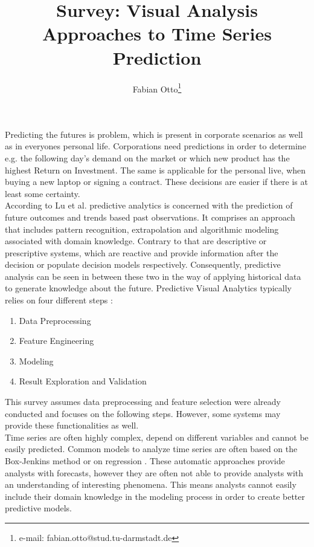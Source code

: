 \documentclass[electronic]{vgtc}             %
\title{Survey: Visual Analysis Approaches to Time Series Prediction}
\author{Fabian Otto\thanks{e-mail: fabian.otto@stud.tu-darmstadt.de}}
\affiliation{\scriptsize Technische Universit\"at Darmstadt}
\begin{document}

\maketitle

Predicting the futures is problem, which is present in corporate scenarios as well as in everyones personal life. 
Corporations need predictions in order to determine e.g. the following day's demand on the market or which new product has the highest Return on Investment.
The same is applicable for the personal live, when buying a new laptop or signing a contract.
These decisions are easier if there is at least some certainty.\\
According to Lu et al. \cite{Lu:2017} predictive analytics is concerned with the prediction of future outcomes and trends based past observations. 
It comprises an approach that includes pattern recognition, extrapolation and algorithmic modeling associated with domain knowledge.
Contrary to that are descriptive or prescriptive systems, which are reactive and provide information after the decision or populate decision models respectively.
Consequently, predictive analysis can be seen in between these two in the way of applying historical data to generate knowledge about the future.
Predictive Visual Analytics typically relies on four different steps \cite{Lu:2017}:
\begin{enumerate}
	\item Data Preprocessing
	\item Feature Engineering
	\item Modeling
	\item Result Exploration and Validation
\end{enumerate}
This survey  
assumes data preprocessing and feature selection were already conducted and focuses on the following steps.
However, some systems may provide these functionalities as well.\\
Time series are often highly complex, depend on different variables and cannot be easily predicted. 
Common models to analyze time series are often based on the Box-Jenkins method \cite{box:2015} or on regression \cite{draper:2014}.
These automatic approaches provide analysts with forecasts, however they are often not able to provide analysts with an understanding of interesting phenomena.
This means analysts cannot easily include their domain knowledge in the modeling process in order to create better predictive models.
\end{document}
